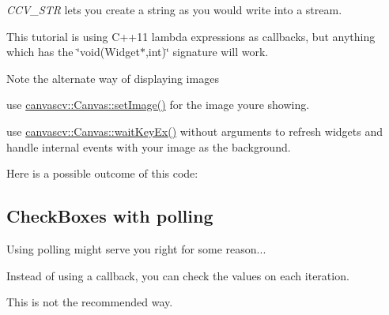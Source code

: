\begin{DoxyItemize}
\item {\itshape C\+C\+V\+\_\+\+S\+TR} lets you create a string as you would write into a stream.
\item This tutorial is using C++11 lambda expressions as callbacks, but anything which has the \char`\"{}void(\+Widget$\ast$,int)\char`\"{} signature will work.
\item Note the alternate way of displaying images
\begin{DoxyItemize}
\item use \hyperlink{classcanvascv_1_1Canvas_a441c5882c7ebebd454a306b3c3478ae7}{canvascv\+::\+Canvas\+::set\+Image()} for the image you\textquotesingle{}re showing.
\item use \hyperlink{classcanvascv_1_1Canvas_a59397db05f5d9e45264f626f6a2ae528}{canvascv\+::\+Canvas\+::wait\+Key\+Ex()} without arguments to refresh widgets and handle internal events with your image as the background.
\end{DoxyItemize}
\item Here is a possible outcome of this code\+:  ~\newline

\end{DoxyItemize}\hypertarget{tutcheckbox_checkbox_s2}{}\subsection{Check\+Boxes with polling}\label{tutcheckbox_checkbox_s2}
Using polling might serve you right for some reason...

Instead of using a callback, you can check the values on each iteration.

This is not the recommended way.

